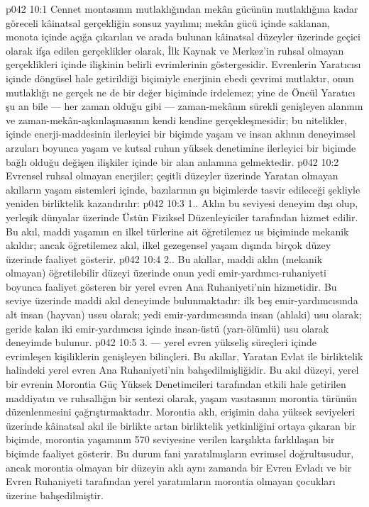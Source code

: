\vs p042 10:1 Cennet montasının mutlaklığından mekân gücünün mutlaklığına kadar göreceli kâinatsal gerçekliğin sonsuz yayılımı; mekân gücü içinde saklanan, monota içinde açığa çıkarılan ve arada bulunan kâinatsal düzeyler üzerinde geçici olarak ifşa edilen gerçeklikler olarak, İlk Kaynak ve Merkez’in ruhsal olmayan gerçeklikleri içinde ilişkinin belirli evrimlerinin göstergesidir. Evrenlerin Yaratıcısı içinde döngüsel hale getirildiği biçimiyle enerjinin ebedi çevrimi mutlaktır, onun mutlaklığı ne gerçek ne de bir değer biçiminde irdelemez; yine de Öncül Yaratıcı şu an bile --- her zaman olduğu gibi --- zaman\hyp{}mekânın sürekli genişleyen alanının ve zaman\hyp{}mekân\hyp{}aşkınlaşmasının kendi kendine gerçekleşmesidir; bu nitelikler, içinde enerji\hyp{}maddesinin ilerleyici bir biçimde yaşam ve insan aklının deneyimsel arzuları boyunca yaşam ve kutsal ruhun yüksek denetimine ilerleyici bir biçimde bağlı olduğu değişen ilişkiler içinde bir alan anlamına gelmektedir.
\vs p042 10:2 Evrensel ruhsal olmayan enerjiler; çeşitli düzeyler üzerinde Yaratan olmayan akılların yaşam sistemleri içinde, bazılarının şu biçimlerde tasvir edileceği şekliyle yeniden birliktelik kazandırılır:
\vs p042 10:3 1.\bibnobreakspace {}. Aklın bu seviyesi deneyim dışı olup, yerleşik dünyalar üzerinde Üstün Fiziksel Düzenleyiciler tarafından hizmet edilir. Bu akıl, maddi yaşamın en ilkel türlerine ait öğretilemez us biçiminde mekanik akıldır; ancak öğretilemez akıl, ilkel gezegensel yaşam dışında birçok düzey üzerinde faaliyet gösterir.
\vs p042 10:4 2.\bibnobreakspace {}. Bu akıllar, maddi aklın (mekanik olmayan) öğretilebilir düzeyi üzerinde onun yedi emir\hyp{}yardımcı\hyp{}ruhaniyeti boyunca faaliyet gösteren bir yerel evren Ana Ruhaniyeti’nin hizmetidir. Bu seviye üzerinde maddi akıl deneyimde bulunmaktadır: ilk beş emir\hyp{}yardımcısında alt insan (hayvan) ussu olarak; yedi emir\hyp{}yardımcısında insan (ahlaki) usu olarak; geride kalan iki emir\hyp{}yardımcısı içinde insan\hyp{}üstü (yarı\hyp{}ölümlü) usu olarak deneyimde bulunur.
\vs p042 10:5 3.\bibnobreakspace {} --- yerel evren yükseliş süreçleri içinde evrimleşen kişiliklerin genişleyen bilinçleri. Bu akıllar, Yaratan Evlat ile birliktelik halindeki yerel evren Ana Ruhaniyeti’nin bahşedilmişliğidir. Bu akıl düzeyi, yerel bir evrenin Morontia Güç Yüksek Denetimcileri tarafından etkili hale getirilen maddiyatın ve ruhsallığın bir sentezi olarak, yaşam vasıtasının morontia türünün düzenlenmesini çağrıştırmaktadır. Morontia aklı, erişimin daha yüksek seviyeleri üzerinde kâinatsal akıl ile birlikte artan birliktelik yetkinliğini ortaya çıkaran bir biçimde, morontia yaşamının 570 seviyesine verilen karşılıkta farklılaşan bir biçimde faaliyet gösterir. Bu durum fani yaratılmışların evrimsel doğrultusudur, ancak morontia olmayan bir düzeyin aklı aynı zamanda bir Evren Evladı ve bir Evren Ruhaniyeti tarafından yerel yaratımların morontia olmayan çocukları üzerine bahşedilmiştir.
